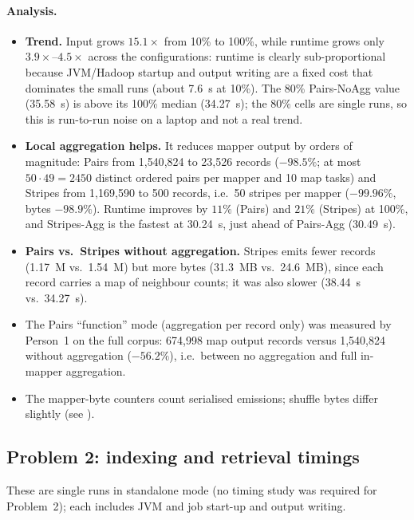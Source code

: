 \documentclass[10pt,a4paper]{article}
\newcommand{\code}[1]{\texttt{\detokenize{#1}}}
\begin{document}
\paragraph{Analysis.}
\begin{itemize}
 \item \textbf{Trend.} Input grows $15.1\times$ from 10\% to 100\%, while runtime grows only $3.9\times$--$4.5\times$ across the configurations: runtime is
 clearly sub-proportional because JVM/Hadoop startup and output writing are a fixed cost that dominates the small runs (about 7.6~s at 10\%).
 The 80\% Pairs-NoAgg value (35.58~s) is above its 100\% median (34.27~s); the 80\% cells are single runs, so this is run-to-run noise on a laptop and not a real trend.
 \item \textbf{Local aggregation helps.} It reduces mapper output by orders of magnitude: Pairs from 1{,}540{,}824 to 23{,}526 records ($-98.5\%$; at most
 $50\cdot49=2450$ distinct ordered pairs per mapper and 10 map tasks) and Stripes from 1{,}169{,}590 to 500 records, i.e.\ 50 stripes per mapper ($-99.96\%$, bytes $-98.9\%$).
 Runtime improves by $11\%$ (Pairs) and $21\%$ (Stripes) at 100\%, and Stripes-Agg is the fastest at 30.24~s, just ahead of Pairs-Agg (30.49~s).
 \item \textbf{Pairs vs.\ Stripes without aggregation.} Stripes emits fewer records (1.17~M vs.\ 1.54~M) but more bytes (31.3~MB vs.\ 24.6~MB), since each record carries a map of neighbour counts; it was also slower (38.44~s vs.\ 34.27~s).
 \item The Pairs ``function'' mode (aggregation per record only) was measured by Person~1 on the full corpus: 674{,}998 map output records versus 1{,}540{,}824 without aggregation ($-56.2\%$), i.e.\ between no aggregation and full in-mapper aggregation.
 \item The mapper-byte counters count serialised emissions; shuffle bytes differ slightly (see \code{problem1_hadoop_counters.txt}).
\end{itemize}

\subsection{Problem 2: indexing and retrieval timings}
These are single runs in standalone mode (no timing study was required for Problem~2); each includes JVM and job start-up and output writing.
\end{document}
